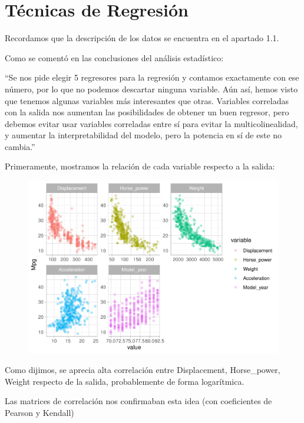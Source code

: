 \section{Técnicas de Regresión}

Recordamos que la descripción de los datos se encuentra en el apartado 1.1.

\vspace{\baselineskip}

Como se comentó en las conclusiones del análisis estadístico:

``Se nos pide elegir 5 regresores para la regresión y contamos exactamente con ese número, por lo que no podemos descartar ninguna variable. Aún así, hemos visto que tenemos algunas variables más interesantes que otras. Variables correladas con la salida nos aumentan las posibilidades de obtener un buen regresor, pero debemos evitar usar variables correladas entre sí para evitar la multicolinealidad, y aumentar la interpretabilidad del modelo, pero la potencia en sí de este no cambia.''

\vspace{\baselineskip}

Primeramente, mostramos la relación de cada variable respecto a la salida:

\begin{figure}[H]\includegraphics[width=.9\linewidth]{img/Regresion_files/figure-latex/unnamed-chunk-2-1} \caption{}\end{figure}

Como dijimos, se aprecia alta correlación entre Displacement, Horse\_power, Weight respecto de la salida, probablemente de forma logarítmica.

Las matrices de correlación nos confirmaban esta idea (con coeficientes de Pearson y Kendall)

